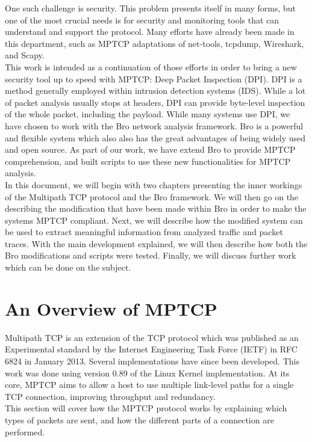 \documentclass[12pt, a4paper, oneside]{article} %
\begin{document}
One such challenge is security. This problem presents itself in many forms, but one of the most crucial needs is for security and monitoring tools that can understand and support the protocol. Many efforts have already been made in this department, such as MPTCP adaptations of net-tools, tcpdump, Wireshark, and Scapy.\\

This work is intended as a continuation of those efforts in order to bring a new security tool up to speed with MPTCP: Deep Packet Inspection (DPI). DPI is a method generally employed within intrusion detection systems (IDS). While a lot of packet analysis usually stops at headers, DPI can provide byte-level inspection of the whole packet, including the payload. While many systems use DPI, we have chosen to work with the Bro network analysis framework. Bro is a powerful and flexible system which also also has the great advantages of being widely used and open source. As part of our work, we have extend Bro to provide MPTCP comprehension, and built scripts to use these new functionalities for MPTCP analysis.\\

In this document, we will begin with two chapters presenting the inner workings of the Multipath TCP protocol and the Bro framework. We will then go on the describing the modification that have been made within Bro in order to make the systems MPTCP compliant. Next, we will describe how the modified system can be used to extract meaningful information from analyzed traffic and packet traces. With the main development explained, we will then describe how both the Bro modifications and scripts were tested. Finally, we will discuss further work which can be done on the subject.

\section{An Overview of MPTCP}
Multipath TCP is an extension of the TCP protocol which was published as an Experimental standard by the Internet Engineering Task Force (IETF) in RFC 6824 in January 2013. Several implementations have since been developed. This work was done using version 0.89 of the Linux Kernel implementation. At its core, MPTCP aims to allow a host to use multiple link-level paths for a single TCP connection, improving throughput and redundancy.\\

This section will cover how the MPTCP protocol works by explaining which types of packets are sent, and how the different parts of a connection are performed.
\end{document}
